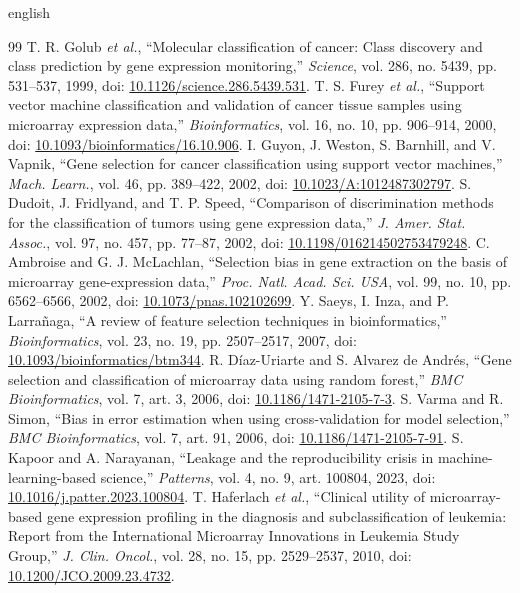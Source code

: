 \documentclass[conference]{IEEEtran}
\begin{document}
\begin{hyphenrules}{english}
\begin{thebibliography}{99}
 T. R. Golub \textit{et al.}, ``Molecular classification of cancer: Class discovery and class prediction by gene expression monitoring,'' \textit{Science}, vol. 286, no. 5439, pp. 531--537, 1999, doi: \url{10.1126/science.286.5439.531}.
 T. S. Furey \textit{et al.}, ``Support vector machine classification and validation of cancer tissue samples using microarray expression data,'' \textit{Bioinformatics}, vol. 16, no. 10, pp. 906--914, 2000, doi: \url{10.1093/bioinformatics/16.10.906}.
 I. Guyon, J. Weston, S. Barnhill, and V. Vapnik, ``Gene selection for cancer classification using support vector machines,'' \textit{Mach. Learn.}, vol. 46, pp. 389--422, 2002, doi: \url{10.1023/A:1012487302797}.
 S. Dudoit, J. Fridlyand, and T. P. Speed, ``Comparison of discrimination methods for the classification of tumors using gene expression data,'' \textit{J. Amer. Stat. Assoc.}, vol. 97, no. 457, pp. 77--87, 2002, doi: \url{10.1198/016214502753479248}.
 C. Ambroise and G. J. McLachlan, ``Selection bias in gene extraction on the basis of microarray gene-expression data,'' \textit{Proc. Natl. Acad. Sci. USA}, vol. 99, no. 10, pp. 6562--6566, 2002, doi: \url{10.1073/pnas.102102699}.
 Y. Saeys, I. Inza, and P. Larrañaga, ``A review of feature selection techniques in bioinformatics,'' \textit{Bioinformatics}, vol. 23, no. 19, pp. 2507--2517, 2007, doi: \url{10.1093/bioinformatics/btm344}.
 R. Díaz-Uriarte and S. Alvarez de Andrés, ``Gene selection and classification of microarray data using random forest,'' \textit{BMC Bioinformatics}, vol. 7, art. 3, 2006, doi: \url{10.1186/1471-2105-7-3}.
 S. Varma and R. Simon, ``Bias in error estimation when using cross-validation for model selection,'' \textit{BMC Bioinformatics}, vol. 7, art. 91, 2006, doi: \url{10.1186/1471-2105-7-91}.
 S. Kapoor and A. Narayanan, ``Leakage and the reproducibility crisis in machine-learning-based science,'' \textit{Patterns}, vol. 4, no. 9, art. 100804, 2023, doi: \url{10.1016/j.patter.2023.100804}.
 T. Haferlach \textit{et al.}, ``Clinical utility of microarray-based gene expression profiling in the diagnosis and subclassification of leukemia: Report from the International Microarray Innovations in Leukemia Study Group,'' \textit{J. Clin. Oncol.}, vol. 28, no. 15, pp. 2529--2537, 2010, doi: \url{10.1200/JCO.2009.23.4732}.

\end{thebibliography}
\end{hyphenrules}
\end{document}
